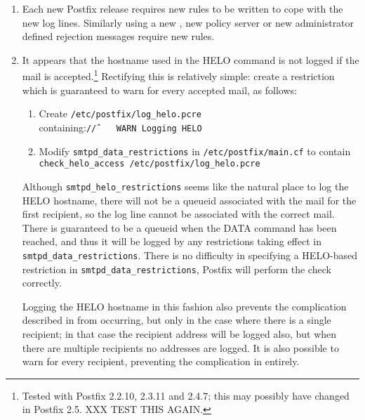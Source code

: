 \begin{enumerate}

    \item Each new Postfix release requires new rules to be written to cope
        with the new log lines.  Similarly using a new \DNSBL{}, new policy
        server or new administrator defined rejection messages require new
        rules.

    \item It appears that the hostname used in the HELO command is not
        logged if the mail is accepted.\footnote{Tested with Postfix
        2.2.10, 2.3.11 and 2.4.7; this may possibly have changed in Postfix
        2.5. XXX TEST THIS AGAIN.}  Rectifying this is relatively simple:
        create a restriction which is guaranteed to warn for every accepted
        mail, as follows:

        \begin{enumerate}

            \item Create \texttt{/etc/postfix/log\_helo.pcre}
                containing:\newline \tab{}\texttt{/\^/~~~~WARN~Logging~HELO}

            \item Modify \texttt{smtpd\_data\_restrictions} in
                \texttt{/etc/postfix/main.cf} to contain\newline
                \tab{}\texttt{check\_helo\_access~/etc/postfix/log\_helo.pcre}

        \end{enumerate}

        Although \texttt{smtpd\_helo\_restrictions} seems like the natural
        place to log the HELO hostname, there will not be a queueid
        associated with the mail for the first recipient, so the log line
        cannot be associated with the correct mail.  There is guaranteed
        to be a queueid when the DATA command has been reached, and thus it
        will be logged by any restrictions taking effect in
        \texttt{smtpd\_data\_restrictions}.  There is no difficulty in
        specifying a HELO-based restriction in
        \texttt{smtpd\_data\_restrictions}, Postfix will perform the check
        correctly.

        Logging the HELO hostname in this fashion also prevents the
        complication described in  from occurring, but only in the case where there is a
        single recipient; in that case the recipient address will be logged
        also, but when there are multiple recipients no addresses are
        logged.  It is also possible to warn for every recipient,
        preventing the complication in  entirely.


\end{enumerate}
